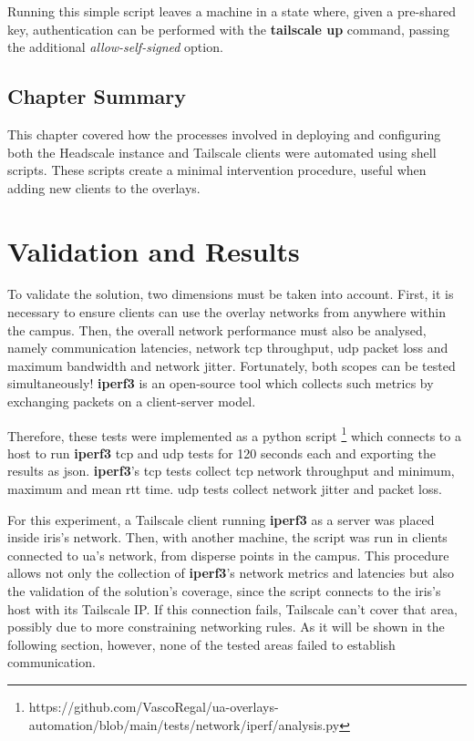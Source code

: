 \documentclass[11pt,twoside,a4paper]{report}
\begin{document}
Running this simple script leaves a machine in a state where, given a pre-shared key, authentication can be performed with the \textbf{tailscale up} command, passing the additional \emph{allow-self-signed} option.

\section{Chapter Summary}

This chapter covered how the processes involved in deploying and configuring both the Headscale instance and Tailscale clients were automated using shell scripts. These scripts create a minimal intervention procedure, useful when adding new clients to the overlays.

\chapter{Validation and Results}
\label{chap:results}

To validate the solution, two dimensions must be taken into account. First, it is necessary to ensure clients can use the overlay networks from anywhere within the campus. Then, the overall network performance must also be analysed, namely communication latencies, network \ac{tcp} throughput, \ac{udp} packet loss and maximum bandwidth and network jitter. Fortunately, both scopes can be tested simultaneously! \textbf{iperf3} is an open-source tool which collects such metrics by exchanging packets on a client-server model.

Therefore, these tests were implemented as a python script \footnote{https://github.com/VascoRegal/ua-overlays-automation/blob/main/tests/network/iperf/analysis.py} which connects to a host to run \textbf{iperf3} \ac{tcp} and \ac{udp} tests for 120 seconds each and exporting the results as \ac{json}. \textbf{iperf3}'s \ac{tcp} tests collect \ac{tcp} network throughput and minimum, maximum and mean \ac{rtt} time. \ac{udp} tests collect network jitter and packet loss.

For this experiment, a Tailscale client running \textbf{iperf3} as a server was placed inside \ac{iris}'s network. Then, with another machine, the script was run in clients connected to \ac{ua}'s network, from disperse points in the campus. This procedure allows not only the collection of \textbf{iperf3}'s network metrics and latencies but also the validation of the solution's coverage, since the script connects to the \ac{iris}'s host with its Tailscale IP. If this connection fails, Tailscale can't cover that area, possibly due to more constraining networking rules. As it will be shown in the following section, however, none of the tested areas failed to establish communication.
\end{document}
